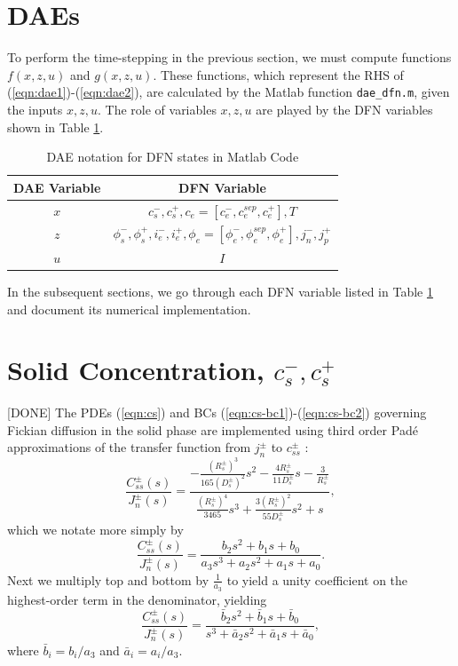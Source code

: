 \documentclass[12pt]{article}
\newcommand{\green}[1]{{\color{green}#1}}
\begin{document}
\section{DAEs}\label{sec:daes}
To perform the time-stepping in the previous section, we must compute functions $f(x,z,u)$ and $g(x,z,u)$. These functions, which represent the RHS of (\ref{eqn:dae1})-(\ref{eqn:dae2}), are calculated by the Matlab function \texttt{dae\_dfn.m}, given the inputs $x,z,u$. The role of variables $x,z,u$ are played by the DFN variables shown in Table \ref{tbl:dae-notation}.

\begin{table}[h]
\caption{DAE notation for DFN states in Matlab Code}
\begin{center}
\begin{tabular}{c|c}
\hline \hline
\textbf{DAE Variable} & \textbf{DFN Variable} \\
\hline
$x$ & $c_{s}^{-}, c_{s}^{+}, c_{e} = [c_{e}^{-}, c_{e}^{sep}, c_{e}^{+}], T$ \\
$z$ & $\phi_{s}^{-}, \phi_{s}^{+}, i_{e}^{-}, i_{e}^{+}, \phi_{e} = [\phi_{e}^{-}, \phi_{e}^{sep}, \phi_{e}^{+}], j_{n}^{-}, j_{p}^{+}$ \\
$u$ & $I$ \\
\hline \hline
\end{tabular}
\end{center}
\label{tbl:dae-notation}
\end{table}%

In the subsequent sections, we go through each DFN variable listed in Table \ref{tbl:dae-notation} and document its numerical implementation.

\section{Solid Concentration, $c_{s}^{-}, c_{s}^{+}$}\label{sec:cs}
\green{[DONE]} The PDEs (\ref{eqn:cs}) and BCs (\ref{eqn:cs-bc1})-(\ref{eqn:cs-bc2}) governing Fickian diffusion in the solid phase are implemented using third order Pad\'{e} approximations of the transfer function from $j_{n}^{\pm}$ to $c_{ss}^{\pm}$ \cite{Forman2011a,Rahn2012}: 
\begin{equation}
	\frac{C_{ss}^{\pm}(s)}{J_{n}^{\pm}(s)} = \frac{-\frac{(R_{s}^{\pm})^3}{165 (D_{s}^{\pm})^2}s^{2} -\frac{4 R_{s}^{\pm}}{11 D_{s}^{\pm}}s -\frac{3}{R_{s}^{\pm} }  }{ \frac{(R_s^{\pm})^4}{3465}s^3 + \frac{3 (R_s^{\pm})^2}{55 D_s^{\pm}}s^2 + s },
\end{equation}
which we notate more simply by
\begin{equation}
	\frac{C_{ss}^{\pm}(s)}{J_{n}^{\pm}(s)} = \frac{b_2 s^{2} + b_1 s + b_0 }{ a_3 s^3 + a_2 s^2 + a_1 s + a_0 }.
\end{equation}
Next we multiply top and bottom by $\frac{1}{a_3}$ to yield a unity coefficient on the highest-order term in the denominator, yielding
\begin{equation}\label{eqn:cs-tf}
	\frac{C_{ss}^{\pm}(s)}{J_{n}^{\pm}(s)} = \frac{\bar{b}_2 s^{2} + \bar{b}_1 s + \bar{b}_0 }{ s^3 + \bar{a}_2 s^2 + \bar{a}_1 s + \bar{a}_0 },
\end{equation}
where $\bar{b}_i = b_i/a_3$ and $\bar{a}_i = a_i/a_3$.
\end{document}

